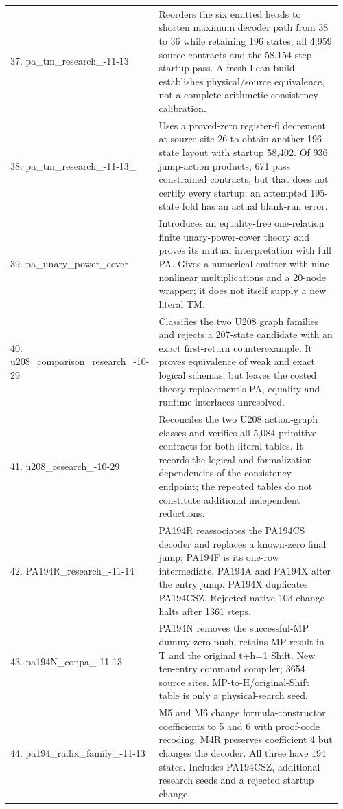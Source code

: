 \begin{longtable}{@{}p{0.35\linewidth}p{0.61\linewidth}@{}}
37. pa\_\allowbreak tm\_\allowbreak research\_\allowbreak 2026-11-13 & Reorders the six emitted heads to shorten maximum decoder path from 38 to 36 while retaining 196 states; all 4,959 source contracts and the 58,154-step startup pass. A fresh Lean build establishes physical/source equivalence, not a complete arithmetic consistency calibration.\\[4pt]
38. pa\_\allowbreak tm\_\allowbreak research\_\allowbreak 2026-11-13\_\allowbreak 2 & Uses a proved-zero register-6 decrement at source site 26 to obtain another 196-state layout with startup 58,402. Of 936 jump-action products, 671 pass constrained contracts, but that does not certify every startup; an attempted 195-state fold has an actual blank-run error.\\[4pt]
39. pa\_\allowbreak unary\_\allowbreak power\_\allowbreak cover & Introduces an equality-free one-relation finite unary-power-cover theory and proves its mutual interpretation with full PA. Gives a numerical emitter with nine nonlinear multiplications and a 20-node wrapper; it does not itself supply a new literal TM.\\[4pt]
40. u208\_\allowbreak comparison\_\allowbreak research\_\allowbreak 2026-10-29 & Classifies the two U208 graph families and rejects a 207-state candidate with an exact first-return counterexample. It proves equivalence of weak and exact logical schemas, but leaves the costed theory replacement's PA, equality and runtime interfaces unresolved.\\[4pt]
41. u208\_\allowbreak research\_\allowbreak 2026-10-29 & Reconciles the two U208 action-graph classes and verifies all 5,084 primitive contracts for both literal tables. It records the logical and formalization dependencies of the consistency endpoint; the repeated tables do not constitute additional independent reductions.\\[4pt]
42. PA194R\_\allowbreak research\_\allowbreak 2026-11-14 & PA194R reassociates the PA194CS decoder and replaces a known-zero final jump; PA194F is its one-row intermediate, PA194A and PA194X alter the entry jump. PA194X duplicates PA194CSZ. Rejected native-103 change halts after 1361 steps.\\[4pt]
43. pa194N\_\allowbreak conpa\_\allowbreak 2026-11-13 & PA194N removes the successful-MP dummy-zero push, retains MP result in T and the original t+h=1 Shift. New ten-entry command compiler; 3654 source sites. MP-to-H/original-Shift table is only a physical-search seed.\\[4pt]
44. pa194\_\allowbreak radix\_\allowbreak family\_\allowbreak 2026-11-13 & M5 and M6 change formula-constructor coefficients to 5 and 6 with proof-code recoding. M4R preserves coefficient 4 but changes the decoder. All three have 194 states. Includes PA194CSZ, additional research seeds and a rejected startup change.\\[4pt]

\end{longtable}
